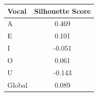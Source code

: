 \begin{tabular}{lc}
\toprule
\rowcolor{col01}
Vocal & Silhouette Score \\
\midrule
A & 0.469 \\
E & 0.101 \\
I & -0.051 \\
O & 0.061 \\
U & -0.143 \\
Global & 0.089 \\
\bottomrule
\end{tabular}
